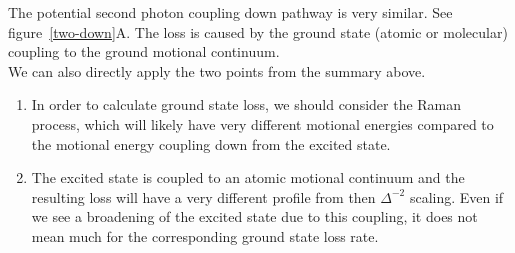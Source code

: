 \documentclass[10pt,fleqn]{article}
\begin{document}
The potential second photon coupling down pathway is very similar.
See \mbox{figure \ref{two-down}A}. The loss is caused by the ground state (atomic or molecular)
coupling to the ground motional continuum.\\

We can also directly apply the two points from the summary above.
\begin{enumerate}
\item In order to calculate ground state loss, we should consider the Raman process,
  which will likely have very different motional energies compared to the motional energy
  coupling down from the excited state.
\item The excited state is coupled to an atomic motional continuum and the resulting loss
  will have a very different profile from then $\Delta^{-2}$ scaling. Even if we
  see a broadening of the excited state due to this coupling, it does not mean much
  for the corresponding ground state loss rate.
\end{enumerate}
\end{document}
